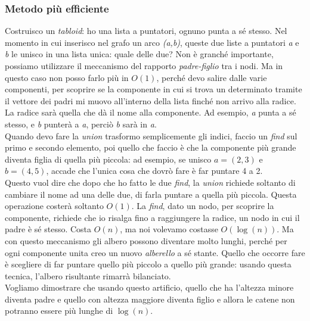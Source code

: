\subsubsection{Metodo più efficiente}
Costruisco un \textit{tabloid}: ho una lista a puntatori, ognuno punta a sé stesso. Nel momento in cui inserisco nel grafo un arco \textit{(a,b)}, queste due liste a puntatori \textit{a} e \textit{b} le unisco in una lista unica: quale delle due? Non è granché importante, possiamo utilizzare il meccanismo del rapporto \textit{padre-figlio} tra i nodi. Ma in questo caso non posso farlo più in $O(1)$, perché devo salire dalle varie componenti, per scoprire se la componente in cui si trova un determinato tramite il vettore dei padri mi muovo all'interno della lista finché non arrivo alla radice. La radice sarà quella che dà il nome alla componente. Ad esempio, \textit{a} punta a sé stesso, e \textit{b} punterà a \textit{a}, perciò \textit{b} sarà in \textit{a}. \\
Quando devo fare la \textit{union} trasformo semplicemente gli indici, faccio un \textit{find} sul primo e secondo elemento, poi quello che faccio è che la componente più grande diventa figlia di quella più piccola: ad esempio, se unisco $a=(2,3)$ e $b=(4,5)$, accade che l'unica cosa che dovrò fare è far puntare 4 a 2. \\
Questo vuol dire che dopo che ho fatto le due \textit{find}, la \textit{union} richiede soltanto di cambiare il nome ad una delle due, di farla puntare a quella più piccola. Questa operazione costerà soltanto $O(1)$. La \textit{find}, dato un nodo, per scoprire la componente, richiede che io risalga fino a raggiungere la radice, un nodo in cui il padre è sé stesso. Costa $O(n)$, ma noi volevamo costasse $O(\log(n))$. Ma con questo meccanismo gli albero possono diventare molto lunghi, perché per ogni componente unita creo un nuovo \textit{alberello} a sé stante. Quello che occorre fare è scegliere di far puntare quello più piccolo a quello più grande: usando questa tecnica, l'albero risultante rimarrà bilanciato. \\
Vogliamo dimostrare che usando questo artificio, quello che ha l'altezza minore diventa padre e quello con altezza maggiore diventa figlio e allora le catene non potranno essere più lunghe di $\log(n)$.
